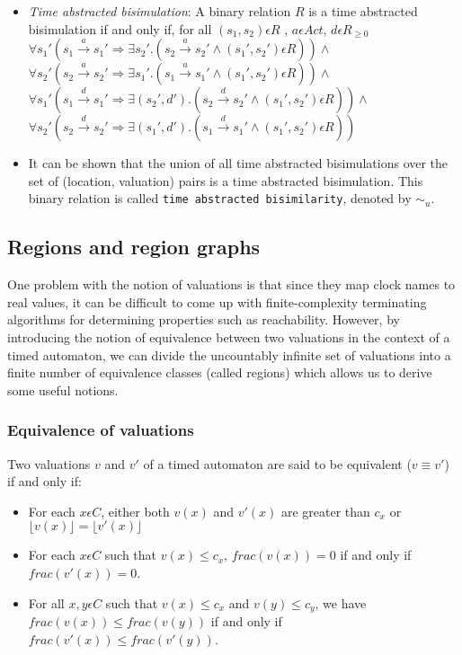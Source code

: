 \documentclass{article}
\begin{document}
  \begin{itemize}
    
  \item \emph{Time abstracted bisimulation}: A binary relation $R$ is
    a time abstracted
    bisimulation if and only if, for all $(s_1, s_2) \epsilon R$ , $a \epsilon Act $, $d \epsilon R_{\ge 0}$\\
    $\forall s_1' (s_1 \xrightarrow{a} s_1' \Rightarrow \exists s_2'
    . (s_2 \xrightarrow{a} s_2' \wedge (s_1', s_2') \epsilon R ) )
    \wedge $ \\
    $\forall s_2' (s_2 \xrightarrow{a} s_2' \Rightarrow \exists s_1'
    . (s_1 \xrightarrow{a} s_1' \wedge (s_1', s_2') \epsilon R ) ) \wedge $ \\
    $\forall s_1' (s_1 \xrightarrow{d} s_1' \Rightarrow \exists (s_2',
    d')
    . (s_2 \xrightarrow{d} s_2' \wedge (s_1', s_2') \epsilon R ) )
    \wedge $ \\
    $\forall s_2' (s_2 \xrightarrow{d} s_2' \Rightarrow \exists (s_1', d')
    . (s_1 \xrightarrow{d} s_1' \wedge (s_1', s_2') \epsilon R ) ) $ \\

  \item It can be shown that the union of all time abstracted bisimulations
    over the set of (location, valuation) pairs is a time abstracted bisimulation. This binary
    relation is called \texttt{time abstracted bisimilarity}, denoted by $\sim_u$.
    

\end{itemize}

\subsection{Regions and region graphs}

One problem with the notion of valuations is that since they map clock
names to real values, it can be difficult to come up with finite-complexity
terminating algorithms for determining properties such as
reachability. However, by introducing the notion of equivalence
between two valuations in the context of a timed automaton, we can
divide the uncountably infinite set of valuations into a finite number
of equivalence classes (called regions) which allows us to derive some
useful notions.

\subsubsection{Equivalence of valuations}
Two valuations $v$ and $v'$ of
a timed automaton are said to be equivalent ($v \equiv v'$) if and
only if:
\begin{itemize}
\item For each $x \epsilon C$, either both $v(x)$ and $v'(x)$ are
  greater than $c_x$ or $\lfloor v(x) \rfloor = \lfloor v'(x)
  \rfloor$
\item For each $x \epsilon C$ such that $v(x) \le c_x$,
  $frac(v(x))=0$ if and only if $frac(v'(x))=0$.
\item For all $x,y \epsilon C$ such that $v(x) \le c_x$ and $v(y)
  \le c_y$, we have $frac(v(x)) \le frac(v(y))$ if and only if
  $frac(v'(x)) \le frac(v'(y))$.
\end{itemize}
\end{document}
